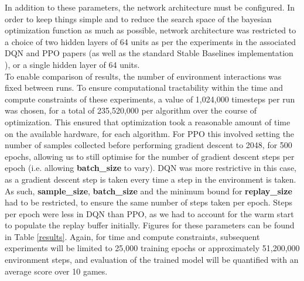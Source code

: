 \documentclass[12pt]{article}
\begin{document}
In addition to these parameters, the network architecture must be configured. In order to keep things simple and to reduce the search space of the bayesian optimization function as much as possible, network architecture was restricted to  a choice of two hidden layers of 64 units as per the experiments in the associated DQN and PPO papers (as well as the standard Stable Baselines implementation \autocite{stable-baselines}), or a single hidden layer of 64 units. 
\\\newline To enable comparison  of results, the number of environment interactions was fixed between runs. To ensure computational tractability within the time and compute constraints of these experiments, a value of 1,024,000 timesteps per run was chosen, for a total of 235,520,000 per algorithm over the course of optimization. This ensured that optimization took a reasonable amount of time on the available hardware, for each algorithm. For PPO this involved setting the number of samples collected before performing gradient descent to 2048, for 500 epochs, allowing us to still optimise for the number of gradient descent steps per epoch (i.e. allowing \textbf{batch\_size} to vary). DQN was more restrictive in this case, as a gradient descent step is taken every time a step in the environment is taken. As such, \textbf{sample\_size}, \textbf{batch\_size} and the minimum bound for \textbf{replay\_size} had to be restricted, to ensure the same number of steps taken per epoch. Steps per epoch were less in DQN than PPO, as we had to account for the warm start to populate the replay buffer initially. Figures for these parameters can be found in Table \ref{results}. Again, for time and compute constraints, subsequent experiments will be limited to 25,000 training epochs or approximately 51,200,000 environment steps, and evaluation of the trained model will be quantified with an average score over 10 games. 
\end{document}
